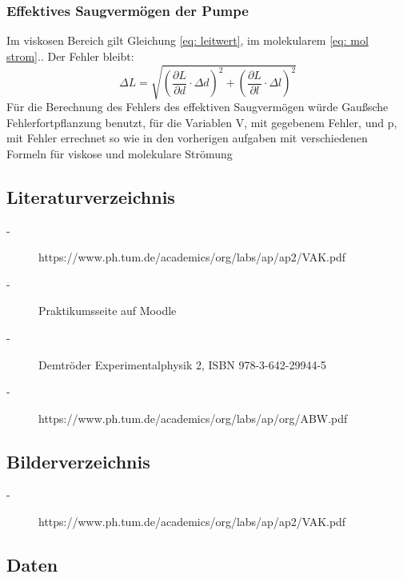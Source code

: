 \documentclass[12pt]{article}
\begin{document}
\subsubsection{Effektives Saugvermögen der Pumpe}
Im viskosen Bereich gilt Gleichung \ref{eq: leitwert}, im molekularem \ref{eq: mol strom}.. Der Fehler bleibt:
\begin{equation}
	\Delta L=\sqrt{\left(\frac{\partial L}{\partial d}\cdot \Delta d\right)^2+\left(\frac{\partial L}{\partial l}\cdot \Delta l\right)^2}
\end{equation}
Für die Berechnung des Fehlers des effektiven Saugvermögen würde Gaußsche Fehlerfortpflanzung benutzt, für die Variablen V, mit gegebenem Fehler, und p, mit Fehler errechnet so wie in den vorherigen aufgaben mit verschiedenen Formeln für viskose und molekulare Strömung
	
\subsection{Literaturverzeichnis}\label{sec:lit}
	\begin{description}
	\item[-]https://www.ph.tum.de/academics/org/labs/ap/ap2/VAK.pdf
	\item[-]Praktikumsseite auf Moodle
	\item[-]Demtröder Experimentalphysik 2, ISBN 978-3-642-29944-5
	\item[-]https://www.ph.tum.de/academics/org/labs/ap/org/ABW.pdf
\end{description}
\subsection{Bilderverzeichnis}
\begin{description}
	\item[-]https://www.ph.tum.de/academics/org/labs/ap/ap2/VAK.pdf
\end{description}
\subsection{Daten}



	
	
\end{document}
